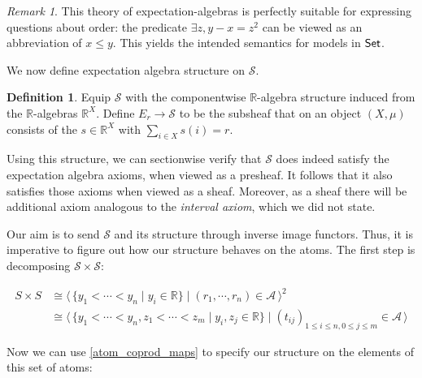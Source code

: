 \documentclass[a4paper]{amsproc}
\theoremstyle{plain}
\theoremstyle{definition}
\newtheorem{definition}[theorem]{Definition}
\theoremstyle{remark}
\newtheorem{remark}[theorem]{Remark}
\numberwithin{equation}{section}
\newcommand{\Set}{\textup{\textsf{Set}}}
\newcommand{\la}{\langle\,}
\newcommand{\ra}{\,\rangle}
\begin{document}
\begin{remark}
    This theory of expectation-algebras is perfectly suitable for expressing questions about order: the predicate $\exists z, y - x = z^2$ can be viewed as an abbreviation of $x \le y$. This yields the intended semantics for models in $\Set$.
\end{remark}

We now define expectation algebra structure on $\mathcal{S}$.

\begin{definition}
    Equip $\mathcal{S}$ with the componentwise $\mathbb{R}$-algebra structure induced from the $\mathbb{R}$-algebras $\mathbb{R}^X$. Define $E_r \xrightarrow{} \mathcal{S}$ to be the subsheaf that on an object $(X,\mu)$ consists of the $s \in \mathbb{R}^X$ with $\sum_{i \in X} s(i) = r$.
\end{definition}

Using this structure, we can sectionwise verify that $\mathcal{S}$ does indeed satisfy the expectation algebra axioms, when viewed as a presheaf. It follows that it also satisfies those axioms when viewed as a sheaf. Moreover, as a sheaf there will be additional axiom analogous to the \emph{interval axiom}, which we did not state.

Our aim is to send $\mathcal{S}$ and its structure through inverse image functors. Thus, it is imperative to figure out how our structure behaves on the atoms. The first step is decomposing $\mathcal{S} \times \mathcal{S}$:

\begin{align*}
    S \times S &\cong \la \{y_1 < \cdots < y_n \mid y_i \in \mathbb{R} \} \mid (r_1, \cdots, r_n) \in \mathcal{A} \ra^2 \\
    &\cong \la \{y_1 < \cdots < y_n, z_1 < \cdots < z_m \mid y_i, z_j \in \mathbb{R} \} \mid (t_{ij})_{1 \leq i \leq n, 0 \leq j \leq m} \in \mathcal{A}\ra
\end{align*}

Now we can use \ref{atom_coprod_maps} to specify our structure on the elements of this set of atoms:
\end{document}
